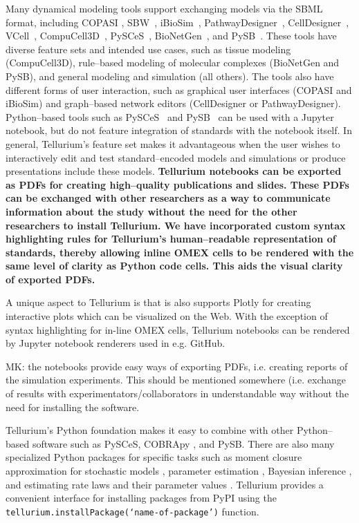\documentclass[10pt,letterpaper]{article}
\begin{document}
Many dynamical modeling tools support exchanging models via the SBML format, including COPASI \cite{hoops2006copasi,mendes2009computational}, SBW~\cite{bergmann2006sbw}, iBioSim~\cite{myers2009ibiosim}, PathwayDesigner~\cite{pathwaydesigner}, CellDesigner~\cite{Funahashi2008,Funahashi2003159}, VCell~\cite{moraru2008virtual,schaff2016rule}, CompuCell3D~\cite{swat2012multi}, PySCeS~\cite{olivier2005modelling}, BioNetGen~\cite{blinov2004bionetgen}, and PySB~\cite{lopez2013programming}. These tools have diverse feature sets and intended use cases, such as tissue modeling (CompuCell3D), rule--based modeling of molecular complexes (BioNetGen and PySB), and general modeling and simulation (all others). The tools also have different forms of user interaction, such as graphical user interfaces (COPASI and iBioSim) and graph--based network editors (CellDesigner or PathwayDesigner). Python--based tools such as PySCeS~\cite{olivier2005modelling} and PySB~\cite{lopez2013programming} can be used with a Jupyter notebook, but do not feature integration of standards with the notebook itself. In general, Tellurium's feature set makes it advantageous when the user wishes to interactively edit and test standard--encoded models and simulations or produce presentations include these models. \textbf{Tellurium notebooks can be exported as PDFs for creating high--quality publications and slides. These PDFs can be exchanged with other researchers as a way to communicate information about the study without the need for the other researchers to install Tellurium. We have incorporated custom syntax highlighting rules for Tellurium's human--readable representation of standards, thereby allowing inline OMEX cells to be rendered with the same level of clarity as Python code cells. This aids the visual clarity of exported PDFs.} %

A unique aspect to Tellurium is that is also supports Plotly for creating interactive plots which can be visualized on the Web. With the exception of syntax highlighting for in-line OMEX cells, Tellurium notebooks can be rendered by Jupyter notebook renderers used in e.g. GitHub.

{\color{orange} MK: the notebooks provide easy ways of exporting PDFs, i.e. creating reports of the simulation experiments. This should be mentioned somewhere (i.e. exchange of results with experimentators/collaborators in understandable way without the need for installing the software.}

Tellurium's Python foundation makes it easy to combine with other Python--based software such as PySCeS, COBRApy \cite{ebrahim2013cobrapy}, and PySB. There are also many specialized Python packages for specific tasks such as moment closure approximation for stochastic models \cite{fan2016means}, parameter estimation \cite{Swaminathan121152}, Bayesian inference \cite{liepe2010abc}, and estimating rate laws and their parameter values \cite{Theisen065177}. Tellurium provides a convenient interface for installing packages from PyPI using the \texttt{tellurium.installPackage(`name-of-package')} function.
\end{document}
